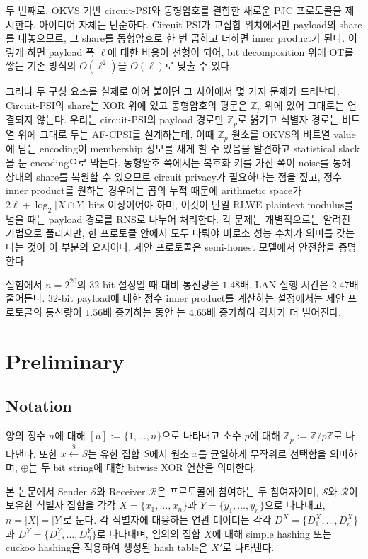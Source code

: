 \documentclass[sigconf,anonymous,review]{acmart}
\begin{document}
두 번째로, OKVS 기반 circuit-PSI와 동형암호를 결합한 새로운 PJC 프로토콜을
제시한다. 아이디어 자체는 단순하다. Circuit-PSI가 교집합 위치에서만 payload의
share를 내놓으므로, 그 share를 동형암호로 한 번 곱하고 더하면 inner product가
된다. 이렇게 하면 payload 폭 $\ell$에 대한 비용이 선형이 되어, bit decomposition
위에 OT를 쌓는 기존 방식의 $O(\ell^2)$을 $O(\ell)$로 낮출 수 있다.

그러나 두 구성 요소를 실제로 이어 붙이면 그 사이에서 몇 가지 문제가 드러난다.
Circuit-PSI의 share는 XOR 위에 있고 동형암호의 평문은 $\mathbb{Z}_p$ 위에
있어 그대로는 연결되지 않는다. 우리는 circuit-PSI의 payload 경로만
$\mathbb{Z}_p$로 옮기고 식별자 경로는 비트열 위에 그대로 두는 AF-CPSI를
설계하는데, 이때 $\mathbb{Z}_p$ 원소를 OKVS의 비트열 value에 담는 encoding이
membership 정보를 새게 할 수 있음을 발견하고 statistical slack을 둔 encoding으로
막는다. 동형암호 쪽에서는 복호화 키를 가진 쪽이 noise를 통해 상대의 share를
복원할 수 있으므로 circuit privacy가 필요하다는 점을 짚고, 정수 inner product를
원하는 경우에는 곱의 누적 때문에 arithmetic space가 $2\ell+\log_2|X\cap Y|$
bits 이상이어야 하며, 이것이 단일 RLWE plaintext modulus를 넘을 때는 payload
경로를 RNS로 나누어 처리한다. 각 문제는 개별적으로는 알려진 기법으로 풀리지만, 한 프로토콜 안에서
모두 다뤄야 비로소 성능 수치가 의미를 갖는다는 것이 이 부분의 요지이다. 제안
프로토콜은 semi-honest 모델에서 안전함을 증명한다.

실험에서 $n=2^{20}$의 32-bit 설정일 때 \cite{KLS26} 대비 통신량은 $1.48$배, LAN
실행 시간은 $2.47$배 줄어든다. 32-bit payload에 대한 정수 inner product를 계산하는
설정에서는
제안 프로토콜의 통신량이 $1.56$배 증가하는 동안 \cite{KLS26}는 $4.65$배
증가하여 격차가 더 벌어진다.

\section{Preliminary}\label{sec:prelim}

\subsection{Notation}\label{sec:notation}
양의 정수 $n$에 대해 $[n] := \{1,\ldots,n\}$으로 나타내고 소수 $p$에 대해 $\mathbb{Z}_p := \mathbb{Z}/p\mathbb{Z}$로 나타낸다.
또한 $x \xleftarrow{\$} S$는 유한 집합 $S$에서 원소 $x$를 균일하게
무작위로 선택함을 의미하며, $\oplus$는 두 bit string에 대한
bitwise XOR 연산을 의미한다.

본 논문에서 Sender $\mathcal{S}$와 Receiver $\mathcal{R}$은 프로토콜에 참여하는 두 참여자이며, $\mathcal{S}$와 $\mathcal{R}$이 보유한 식별자 집합을 각각 $X=\{x_1,\ldots,x_n\}$과 $Y=\{y_1,\ldots,y_n\}$으로 나타내고, $n=|X|=|Y|$로 둔다.
각 식별자에 대응하는 연관 데이터는 각각
$D^X=\{D^X_1,\ldots,D^X_n\}$과
$D^Y=\{D^Y_1,\ldots,D^Y_n\}$로 나타내며, 임의의 집합 $X$에 대해 simple hashing 또는 cuckoo hashing을
적용하여 생성된 hash table은 $X'$로 나타낸다.
\end{document}
